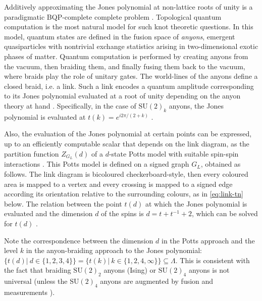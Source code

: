 Additively approximating the Jones polynomial at non-lattice roots of unity is a paradigmatic BQP-complete complete problem \cite{Aharonov_2008,kuperberg2014hard}.
Topological quantum computation \cite{Freedman2002,pachos_2012} is the most natural model for such knot theoretic questions. In this model, quantum states are defined in the fusion space of \emph{anyons}, emergent quasiparticles with nontrivial exchange statistics arising in two-dimensional exotic phases of matter.
Quantum computation is performed by creating anyons from the vacuum, then braiding them, and finally fusing them back to the vacuum, where braids play the role of unitary gates.
The world-lines of the anyons define a closed braid, i.e. a link.
Such a link encodes a quantum amplitude corresponding to its Jones polynomial evaluated at a root of unity depending on the anyon theory at hand \cite{Witten1989}. 
Specifically, in the case of $\text{SU}(2)_k$ anyons, the Jones polynomial is evaluated at $t(k) = e^{i 2\pi/(2+k)}$ \cite{Rowell_2018}.

Also, the evaluation of the Jones polynomial at certain points can be expressed, up to an efficiently computable scalar that depends on the link diagram, as the partition function $Z_{G_L}(d)$ of a $d$-state Potts model with suitable spin-spin interactions \cite{RevModPhys.64.1099}.
This Potts model is defined on a signed graph $G_L$, obtained as follows.
The link diagram is bicoloured checkerboard-style,
then every coloured area is mapped to a vertex and every crossing is mapped to a signed edge according
its orientation relative to the surrounding colours, as in \eqref{eq:link-tn} below. 
The relation between the point $t(d)$ at which the Jones polynomial is evaluated and the dimension $d$ of the spins is $d = t + t^{-1} +2$,
which can be solved for $t(d)$ \cite{PhysRevE.100.033303}.

Note the correspondence between the dimension $d$ in the Potts approach and the level $k$ in the anyon-braiding approach to the Jones polynomial: $\{t(d) | ~ d \in\{1,2,3,4\} \} = \{ t(k) | ~ k\in\{1,2,4,\infty\} \} \subseteq \Lambda$.
This is consistent with the fact that braiding $\text{SU}(2)_2$ anyons (Ising) or $\text{SU}(2)_4$ anyons is not universal (unless the $\text{SU}(2)_4$ anyons are augmented by fusion and measurements \cite{Levaillant_2015}).

